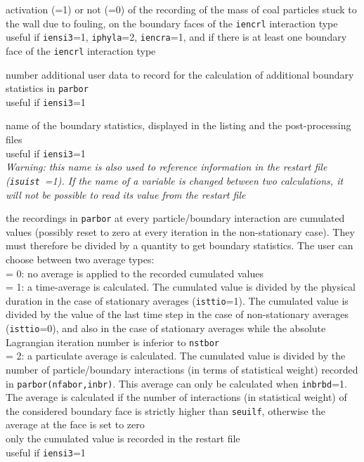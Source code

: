{activation (=1) or not (=0) of the recording of the mass of coal particles
stuck to the wall due to fouling, on the boundary faces of the \texttt{iencrl}
interaction type\\
useful if \texttt{iensi3}=1, \texttt{iphyla}=2, \texttt{iencra}=1, and if
there is at least one boundary face of the \texttt{iencrl} interaction
type}

{number additional user data to record for the calculation
of additional boundary statistics in \texttt{parbor}\\
useful if \texttt{iensi3}=1}

{name of the boundary statistics, displayed in the listing
and the post-processing files\\
useful if \texttt{iensi3}=1\\
{\em Warning: this name is also used to reference information in the restart file
\mbox{(\texttt{isuist} =1)}. If the name of a variable is changed between two
calculations, it will not be possible to read its value from the restart file}}

{the recordings in \texttt{parbor} at every particle/boundary interaction are
cumulated values (possibly reset to zero at every iteration in the
non-stationary case). They must therefore be divided by a quantity to
get boundary statistics. The user can choose between two average types:\\
\hspace*{1.3cm} = 0: no average is applied to the recorded cumulated values\\
\hspace*{1.3cm} = 1: a time-average is calculated. The cumulated value
is divided by the physical duration in the case of stationary
averages (\texttt{isttio}=1). The cumulated value is divided by the value of
the last time step in the case of non-stationary averages (\texttt{isttio}=0),
and also in the case of stationary averages while the
absolute Lagrangian iteration number is inferior to \texttt{nstbor}\\
\hspace*{1.3cm} = 2: a particulate average is calculated. The cumulated
value is divided by the number of particle/boundary interactions (in terms of
statistical weight) recorded in \texttt{parbor(nfabor,inbr)}. This average
can only be calculated when \texttt{inbrbd}=1. The average is calculated if
the number of interactions (in statistical weight) of the considered
boundary face is strictly higher than \texttt{seuilf}, otherwise the average
at the face is set to zero\\
only the cumulated value is recorded in the restart file\\
useful if \texttt{iensi3}=1}

